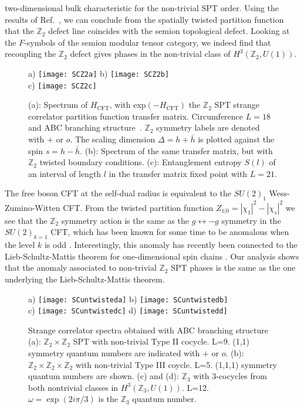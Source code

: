 \documentclass[aps,pra,twocolumn,superscriptaddress,10pt,article,nofootinbib,showpacs]{revtex4-1}
\begin{document}
two-dimensional bulk characteristic for the non-trivial SPT order. Using the results of Ref.~\cite{FrohlichFuchs2}, we can conclude from the spatially twisted partition function that the $\mathbb{Z}_2$ defect line coincides with the semion topological defect. Looking at the $F$-symbols of the semion modular tensor category, we indeed find that recoupling the $\mathbb{Z}_2$ defect gives phases in the non-trivial class of $H^3(\mathbb{Z}_2,U(1))$.

\begin{figure}[t]
a)
\texttt{[image: SCZ2a]} \hspace{1 mm}b)
\texttt{[image: SCZ2b]}\\ c)
\texttt{[image: SCZ2c]}
\caption{(a): Spectrum of $H_{\text{CFT}}$, with $\text{exp}(-H_{\text{CFT}})$ the $\mathbb{Z}_2$  SPT strange correlator partition function transfer matrix. Circumference $L=18$ and ABC branching structure~\cite{ScaffidiRingel}. $\mathbb{Z}_2$ symmetry labels are denoted with $+$ or $o$. The scaling dimension $\Delta=h+\bar{h}$ is plotted against the spin $s=h-\bar{h}$. (b): Spectrum of the same transfer matrix, but with $\mathbb{Z}_2$ twisted boundary conditions. (c): Entanglement entropy $S(l)$ of an interval of length $l$ in the transfer matrix fixed point with $L=21$.}\label{fig:SCZ2}
\end{figure}

The free boson CFT at the self-dual radius is equivalent to the $SU(2)_1$ Wess-Zumino-Witten CFT. From the twisted partition function $Z_{1|0}=|\chi_1|^2-|\chi_s|^2$ we see that the $\mathbb{Z}_2$ symmetry action is the same as the $g\leftrightarrow -g$ symmetry in the $SU(2)_{k=1}$ CFT, which has been known for some time to be anomalous when the level $k$ is odd \cite{GepnerWitten}. Interestingly, this anomaly has recently been connected to the Lieb-Schultz-Mattis theorem for one-dimensional spin chains \cite{FuruyaOshikawa,JianBi,ChoHsieh,MetlitskiThorngren}. Our analysis shows that the anomaly associated to non-trivial $\mathbb{Z}_2$ SPT phases is the same as the one underlying the Lieb-Schultz-Mattis theorem.

\begin{figure}[h]
a)
\texttt{[image: SCuntwisteda]}  \hspace{1 mm} b)
\texttt{[image: SCuntwistedb]} \\ c)
\texttt{[image: SCuntwistedc]}\hspace{1 mm}  d)
\texttt{[image: SCuntwistedd]}
\caption{Strange correlator spectra obtained with ABC branching structure \cite{ScaffidiRingel} (a): $\mathbb{Z}_2\times\mathbb{Z}_2$ SPT with non-trivial Type II cocycle. L=9. (1,1) symmetry quantum numbers are indicated with $+$ or $o$. (b): $\mathbb{Z}_2\times\mathbb{Z}_2\times \mathbb{Z}_2$ with non-trivial Type III coycle. L=5. (1,1,1) symmetry quantum numbers are shown. (c) and (d): $\mathbb{Z}_3$ with 3-cocycles from both nontrivial
classes in $H^3(\mathbb{Z}_3,U(1))$. L=12. $\omega = \exp(2i\pi /3)$ is the $\mathbb{Z}_3$ quantum number.}\label{fig:SCUntwisted}
\end{figure}
\end{document}
